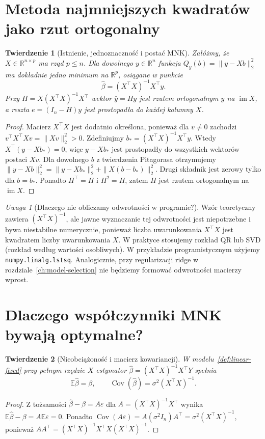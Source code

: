 \documentclass[11pt,a4paper,oneside]{report}
\numberwithin{equation}{chapter}
\theoremstyle{plain}
\newtheorem{twierdzenie}{Twierdzenie}[chapter]
\theoremstyle{definition}
\theoremstyle{remark}
\newtheorem{uwaga}{Uwaga}[chapter]
\newcommand{\R}{\mathbb R}
\newcommand{\E}{\mathbb E}
\newcommand{\Cov}{\operatorname{Cov}}
\begin{document}
\section{Metoda najmniejszych kwadratów jako rzut ortogonalny}
\begin{twierdzenie}[Istnienie, jednoznaczność i postać MNK]
\label{thm:ols-formula}
Załóżmy, że $X\in\R^{n\times p}$ ma rząd $p\le n$.
Dla dowolnego $y\in\R^n$ funkcja
$Q_y(b)=\|y-Xb\|_2^2$ ma dokładnie jedno minimum
na $\R^p$, osiągane w punkcie
\[
 \widehat\beta=(X^\top X)^{-1}X^\top y.
\]
Przy $H=X(X^\top X)^{-1}X^\top$ wektor
$\widehat y=Hy$ jest rzutem ortogonalnym $y$ na
$\operatorname{im}X$, a reszta $e=(I_n-H)y$ jest
prostopadła do każdej kolumny $X$.
\end{twierdzenie}
\begin{proof}
Macierz $X^\top X$ jest dodatnio określona, ponieważ
dla $v\ne0$ zachodzi
$v^\top X^\top Xv=\|Xv\|_2^2>0$.
Zdefiniujmy $b_*=(X^\top X)^{-1}X^\top y$.
Wtedy $X^\top(y-Xb_*)=0$, więc $y-Xb_*$ jest
prostopadły do wszystkich wektorów postaci $Xv$.
Dla dowolnego $b$ z twierdzenia Pitagorasa otrzymujemy
$\|y-Xb\|_2^2=\|y-Xb_*\|_2^2+\|X(b-b_*)\|_2^2$.
Drugi składnik jest zerowy tylko dla $b=b_*$.
Ponadto $H^\top=H$ i $H^2=H$, zatem $H$ jest
rzutem ortogonalnym na $\operatorname{im}X$.
\end{proof}

\begin{uwaga}[Dlaczego nie obliczamy odwrotności w programie?]
Wzór teoretyczny zawiera $(X^\top X)^{-1}$, ale
jawne wyznaczanie tej odwrotności jest niepotrzebne i
bywa niestabilne numerycznie, ponieważ liczba uwarunkowania
$X^\top X$ jest kwadratem liczby uwarunkowania $X$.
W praktyce stosujemy rozkład QR lub SVD (rozkład według
wartości osobliwych). W przykładzie programistycznym
użyjemy \texttt{numpy.linalg.lstsq}. Analogicznie,
przy regularizacji ridge w rozdziale~\ref{ch:model-selection}
nie będziemy formować odwrotności macierzy wprost.
\end{uwaga}

\section{Dlaczego współczynniki MNK bywają optymalne?}
\begin{twierdzenie}[Nieobciążoność i macierz kowariancji]
\label{thm:ols-cov}
W modelu~\ref{def:linear-fixed} przy pełnym rzędzie $X$
estymator $\widehat\beta=(X^\top X)^{-1}X^\top Y$
spełnia
\[
 \E\widehat\beta=\beta,\qquad
 \Cov(\widehat\beta)=\sigma^2(X^\top X)^{-1}.
\]
\end{twierdzenie}
\begin{proof}
Z tożsamości $\widehat\beta-\beta=A\varepsilon$ dla
$A=(X^\top X)^{-1}X^\top$ wynika
$\E\widehat\beta-\beta=A\E\varepsilon=0$.
Ponadto $\Cov(A\varepsilon)=A(\sigma^2I_n)A^\top
=\sigma^2(X^\top X)^{-1}$, ponieważ
$AA^\top=(X^\top X)^{-1}X^\top X(X^\top X)^{-1}$.
\end{proof}
\end{document}
